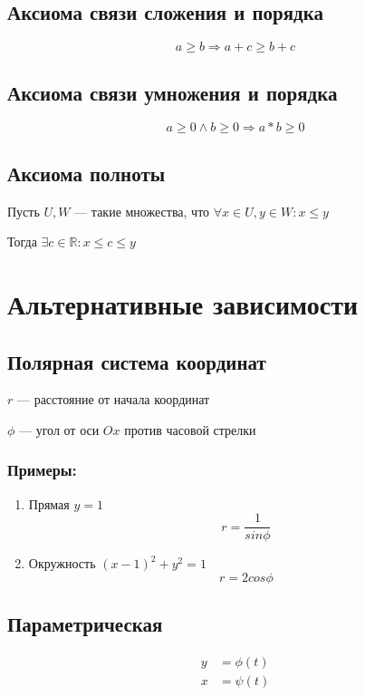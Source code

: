 \documentclass{article}
\begin{document}
\subsection{Аксиома связи сложения и порядка}

\[ a \ge b \Rightarrow a + c \ge b + c \]

\subsection{Аксиома связи умножения и порядка}

\[ a \ge 0 \land b \ge 0 \Rightarrow a * b \ge 0 \]

\subsection{Аксиома полноты}

Пусть $U, W$ --- такие множества, что $\forall x \in U, y \in W : x \le y$

Тогда $\exists c \in \mathbb{R} : x \le c \le y$

\pagebreak
\section{Альтернативные зависимости}

\subsection{Полярная система координат}

$r$ --- расстояние от начала координат

$\phi$ --- угол от оси $Ox$ против часовой стрелки

\subsubsection*{Примеры:}

\begin{enumerate}
	\item Прямая $y = 1$
	\[ r = \frac{1}{sin \phi} \]
	\item Окружность $(x - 1)^2 + y^2 = 1$
	\[ r = 2 cos \phi \]
\end{enumerate}

\subsection{Параметрическая}

\begin{align*}
	y &= \phi(t) \\
	x &= \psi(t)
\end{align*}
\end{document}
